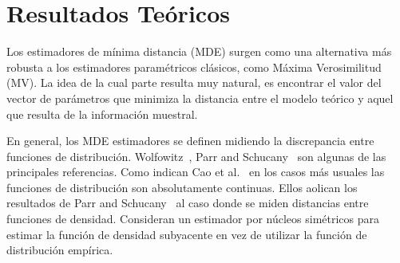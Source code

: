 
\chapter{Resultados Teóricos}
\label{ResultadosTeoricos}

Los estimadores de mínima distancia (MDE) surgen como una alternativa más robusta a los estimadores paramétricos clásicos, como Máxima Verosimilitud (MV). La idea de la cual parte resulta muy natural, es encontrar el valor del vector de parámetros que minimiza la distancia entre el modelo teórico y aquel que resulta de la información muestral.

%

En general, los MDE estimadores se definen midiendo la discrepancia entre funciones de distribución. Wolfowitz~\cite{Wolfowitz1954}, Parr and Schucany~\cite{Parr1980} son algunas de las principales referencias. Como indican Cao et al.~\cite{cao1995minimum} en los casos más usuales las funciones de distribución son absolutamente continuas. Ellos aolican los resultados de Parr and Schucany~\cite{parr1982} al caso donde se miden distancias entre funciones de densidad. Consideran un estimador por núcleos simétricos para estimar la función de densidad subyacente en vez de utilizar la función de distribución empírica.

